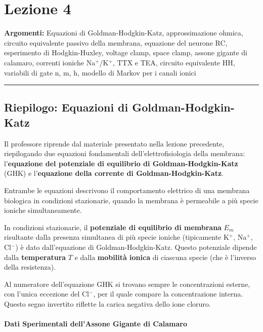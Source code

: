 \chapter{Lezione 4}


\textbf{Argomenti:} Equazioni di Goldman-Hodgkin-Katz, approssimazione ohmica, circuito equivalente passivo della membrana, equazione del neurone RC, esperimento di Hodgkin-Huxley, voltage clamp, space clamp, assone gigante di calamaro, correnti ioniche Na$^+$/K$^+$, TTX e TEA, circuito equivalente HH, variabili di gate n, m, h, modello di Markov per i canali ionici

\vspace{0.5cm}
\noindent\rule{\textwidth}{0.4pt}
\vspace{0.5cm}

\section{Riepilogo: Equazioni di Goldman-Hodgkin-Katz}


Il professore riprende dal materiale presentato nella lezione precedente, riepilogando due equazioni fondamentali dell'elettrofisiologia della membrana: l'\textbf{equazione del potenziale di equilibrio di Goldman-Hodgkin-Katz} (GHK) e l'\textbf{equazione della corrente di Goldman-Hodgkin-Katz}.

Entrambe le equazioni descrivono il comportamento elettrico di una membrana biologica in condizioni stazionarie, quando la membrana è permeabile a più specie ioniche simultaneamente.



In condizioni stazionarie, il \textbf{potenziale di equilibrio di membrana} $E_m$ risultante dalla presenza simultanea di più specie ioniche (tipicamente K$^+$, Na$^+$, Cl$^-$) è dato dall'equazione di Goldman-Hodgkin-Katz. Questo potenziale dipende dalla \textbf{temperatura} $T$ e dalla \textbf{mobilità ionica} di ciascuna specie (che è l'inverso della resistenza).

\begin{tcolorbox}[colback=gray!5, colframe=gray!40, arc=2mm, boxrule=0.5pt]
Al numeratore dell'equazione GHK si trovano sempre le concentrazioni esterne, con l'unica eccezione del Cl$^-$, per il quale compare la concentrazione interna. Questo segno invertito riflette la carica negativa dello ione cloruro.
\end{tcolorbox}


\subsubsection{Dati Sperimentali dell'Assone Gigante di Calamaro}

